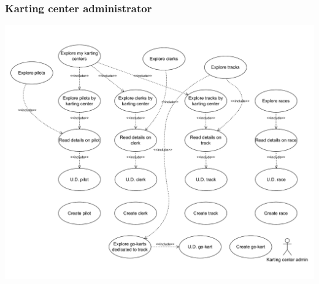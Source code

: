 \documentclass{beamer}
\begin{document}

\begin{frame}
    \frametitle{Karting center administrator}
    \centering
    \includegraphics[width=0.7\linewidth]{drawio/karting-center-admin.pdf}
\end{frame}
\end{document}
